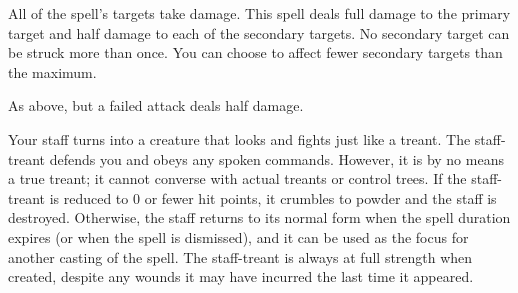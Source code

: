 \spellrng{\rngmed}
\begin{spellsuccess}
    All of the spell's targets take damage. This spell deals full damage to the primary target and half damage to each of the secondary targets. No secondary target can be struck more than once. You can choose to affect fewer secondary targets than the maximum.
\end{spellsuccess}
\begin{spellfailure}
    As above, but a failed attack deals half damage.
\end{spellfailure}

\spellrng{\rngtouch}
\begin{spelleffect}
  Your staff turns into a creature that looks and fights just like a treant. The staff-treant defends you and obeys any spoken commands. However, it is by no means a true treant; it cannot converse with actual treants or control trees. If the staff-treant is reduced to 0 or fewer hit points, it crumbles to powder and the staff is destroyed. Otherwise, the staff returns to its normal form when the spell duration expires (or when the spell is dismissed), and it can be used as the focus for another casting of the spell. The staff-treant is always at full strength when created, despite any wounds it may have incurred the last time it appeared.
\end{spelleffect}

